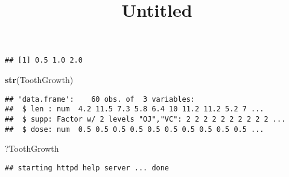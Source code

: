 \documentclass[
]{article}
\title{Untitled}
\author{}
\date{\vspace{-2.5em}}
\newenvironment{Shaded}{\begin{snugshade}}{\end{snugshade}}
\newcommand{\CommentTok}[1]{\textcolor[rgb]{0.56,0.35,0.01}{\textit{#1}}}
\newcommand{\KeywordTok}[1]{\textcolor[rgb]{0.13,0.29,0.53}{\textbf{#1}}}
\newcommand{\NormalTok}[1]{#1}
\newcommand{\OperatorTok}[1]{\textcolor[rgb]{0.81,0.36,0.00}{\textbf{#1}}}
\newcommand{\StringTok}[1]{\textcolor[rgb]{0.31,0.60,0.02}{#1}}
\begin{document}
\maketitle

\begin{Shaded}
\end{Shaded}

\begin{verbatim}
## [1] 0.5 1.0 2.0
\end{verbatim}

\begin{Shaded}
\begin{Highlighting}[]
\KeywordTok{str}\NormalTok{(ToothGrowth)}
\end{Highlighting}
\end{Shaded}

\begin{verbatim}
## 'data.frame':    60 obs. of  3 variables:
##  $ len : num  4.2 11.5 7.3 5.8 6.4 10 11.2 11.2 5.2 7 ...
##  $ supp: Factor w/ 2 levels "OJ","VC": 2 2 2 2 2 2 2 2 2 2 ...
##  $ dose: num  0.5 0.5 0.5 0.5 0.5 0.5 0.5 0.5 0.5 0.5 ...
\end{verbatim}

\begin{Shaded}
\begin{Highlighting}[]
\NormalTok{?ToothGrowth}
\end{Highlighting}
\end{Shaded}

\begin{verbatim}
## starting httpd help server ... done
\end{verbatim}

\begin{Shaded}
\end{Shaded}
\end{document}
